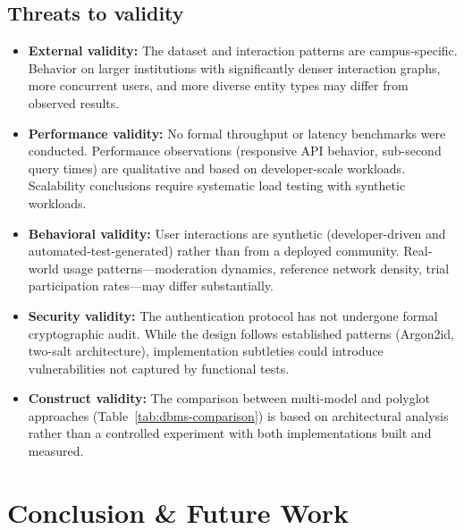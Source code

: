 \documentclass[13pt,a4paper]{report}
\begin{document}
\section{Threats to validity}
\begin{itemize}
    \item \textbf{External validity:} The dataset and interaction patterns are campus-specific. Behavior on larger institutions with significantly denser interaction graphs, more concurrent users, and more diverse entity types may differ from observed results.
    \item \textbf{Performance validity:} No formal throughput or latency benchmarks were conducted. Performance observations (responsive API behavior, sub-second query times) are qualitative and based on developer-scale workloads. Scalability conclusions require systematic load testing with synthetic workloads.
    \item \textbf{Behavioral validity:} User interactions are synthetic (developer-driven and automated-test-generated) rather than from a deployed community. Real-world usage patterns---moderation dynamics, reference network density, trial participation rates---may differ substantially.
    \item \textbf{Security validity:} The authentication protocol has not undergone formal cryptographic audit. While the design follows established patterns (Argon2id, two-salt architecture), implementation subtleties could introduce vulnerabilities not captured by functional tests.
    \item \textbf{Construct validity:} The comparison between multi-model and polyglot approaches (Table~\ref{tab:dbms-comparison}) is based on architectural analysis rather than a controlled experiment with both implementations built and measured.
\end{itemize}

\chapter{Conclusion \& Future Work}
\end{document}
